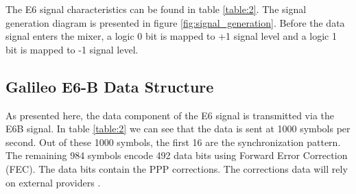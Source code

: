 The E6 signal characteristics can be found in table \ref{table:2}. The signal generation diagram is presented in figure \ref{fig:signal_generation}. Before the data signal enters the mixer, a logic 0 bit is mapped to +1 signal level and a logic 1 bit is mapped to -1 signal level\cite{e6breceiver}.

\subsection{Galileo E6-B Data Structure}
\label{subsec:e6data}

As presented here, the data component of the E6 signal is transmitted via the E6B signal. In table \ref{table:2} we can see that the data is sent at 1000 symbols per second. Out of these 1000 symbols, the first 16 are the synchronization pattern. The remaining 984 symbols encode 492 data bits using Forward Error Correction (FEC). The data bits contain the PPP corrections. The corrections data will rely on external providers \cite{e6breceiver}. 


